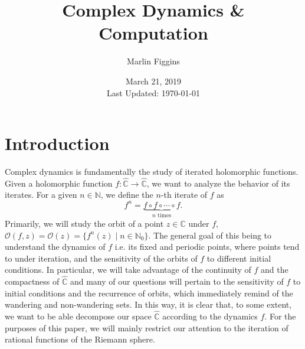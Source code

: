 \documentclass{amsart}
\title{Complex Dynamics \& Computation}\author{Marlin Figgins}
\date{March 21, 2019\\ Last Updated: \today}
\newcommand{\bbN}{\mathbb{N}}
\newcommand{\bbC}{\mathbb{C}}
\newcommand{\orb}{\mathscr{O}}
\newcommand{\bbCS}{\hat{\bbC}}
\theoremstyle{definition}
\theoremstyle{remark}
\numberwithin{equation}{section}
\begin{document}
	\maketitle

\tableofcontents

	\section*{Introduction}


Complex dynamics is fundamentally the study of iterated holomorphic functions. Given a holomorphic function $f:\bbCS\to \bbCS$, we want to analyze the behavior of its iterates. For a given $n\in\bbN$, we define the $n$-th iterate of $f$ as
\[
f^n=\underbrace{f\circ f\circ \dotsb \circ f}_{n \text{ times}}.
\]
Primarily, we will study the orbit of a point $z\in\bbC$ under $f$, $\orb(f,z)=\orb(z)=\{f^n(z)\mid n\in \bbN_0 \}$. The general goal of this being to understand the dynamics of $f$ i.e. its fixed and periodic points, where points tend to under iteration, and the sensitivity of the orbits of $f$ to different initial conditions. In particular, we will take advantage of the continuity of $f$ and the compactness of $\bbCS$ and many of our questions will pertain to the sensitivity of $f$ to initial conditions and the recurrence of orbits, which immediately remind of the wandering and non-wandering sets. In this way, it is clear that, to some extent, we want to be able decompose our space $\bbCS$ according to the dynamics $f$. For the purposes of this paper, we will mainly restrict our attention to the iteration of rational functions of the Riemann sphere.\\
\end{document}

